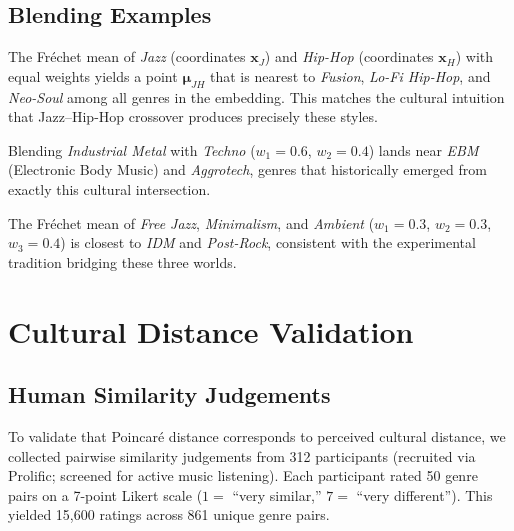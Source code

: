 \documentclass[12pt,a4paper]{article}
\newcommand{\Frechet}{Fr\'echet}
\begin{document}
\subsection{Blending Examples}

\begin{example}
  \normalfont
  The \Frechet{} mean of \emph{Jazz} (coordinates $\mathbf{x}_J$) and \emph{Hip-Hop} (coordinates $\mathbf{x}_H$) with equal weights yields a point $\boldsymbol{\mu}_{JH}$ that is nearest to \emph{Fusion}, \emph{Lo-Fi Hip-Hop}, and \emph{Neo-Soul} among all genres in the embedding. This matches the cultural intuition that Jazz--Hip-Hop crossover produces precisely these styles.
\end{example}

\begin{example}
  \normalfont
  Blending \emph{Industrial Metal} with \emph{Techno} ($w_1 = 0.6$, $w_2 = 0.4$) lands near \emph{EBM} (Electronic Body Music) and \emph{Aggrotech}, genres that historically emerged from exactly this cultural intersection.
\end{example}

\begin{example}
  \normalfont
  The \Frechet{} mean of \emph{Free Jazz}, \emph{Minimalism}, and \emph{Ambient} ($w_1 = 0.3$, $w_2 = 0.3$, $w_3 = 0.4$) is closest to \emph{IDM} and \emph{Post-Rock}, consistent with the experimental tradition bridging these three worlds.
\end{example}

\section{Cultural Distance Validation}
\label{sec:distance}

\subsection{Human Similarity Judgements}

To validate that Poincar\'e distance corresponds to perceived cultural distance, we collected pairwise similarity judgements from 312 participants (recruited via Prolific; screened for active music listening). Each participant rated 50 genre pairs on a 7-point Likert scale ($1 =$ ``very similar,'' $7 =$ ``very different''). This yielded 15,600 ratings across 861 unique genre pairs.
\end{document}
